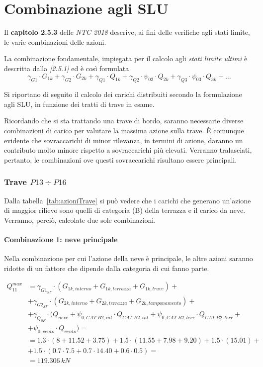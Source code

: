 \section{Combinazione agli SLU}
Il \textbf{capitolo 2.5.3} delle \emph{NTC 2018} descrive, ai fini delle verifiche agli stati limite, le varie combinazioni delle azioni. 

La combinazione fondamentale, impiegata per il calcolo agli \emph{stati limite ultimi} è descritta dalla \emph{[2.5.1]} ed è così formulata
\[
	\gamma_{G1}\cdot G_{1k} + \gamma_{G2}\cdot G_{2k} + \gamma_{Q1} \cdot Q_{1k} + \gamma_{Q2}\cdot \psi_{02}\cdot Q_{2k} + \gamma_{Q3}\cdot \psi_{03}\cdot Q_{3k} + \dots
\]

Si riportano di seguito il calcolo dei carichi distribuiti secondo la formulazione agli SLU, in funzione dei tratti di trave in esame.

Ricordando che si sta trattando una trave di bordo, saranno necessarie diverse combinazioni di carico per valutare la massima azione sulla trave. È comunque evidente che sovraccarichi di minor rilevanza, in termini di azione, daranno un contributo molto minore rispetto a sovraccarichi più elevati. Verranno tralasciati, pertanto, le combinazioni ove questi sovraccarichi risultano essere principali.

\subsubsection*{Trave $P13\div P16$}
Dalla tabella~\ref{tab:azioniTrave} si può vedere che i carichi che generano un'azione di maggior rilievo sono quelli di categoria (B) della terrazza e il carico da neve. Verranno, perciò, calcolate due sole combinazioni.

\paragraph{Combinazione 1: neve principale}
Nella combinazione per cui l'azione della neve è principale, le altre azioni saranno ridotte di un fattore che dipende dalla categoria di cui fanno parte.

\begin{align*}
	Q_{11}^{max} &=\gamma_{G1_{SF}}\cdot\left( G_{1k, interno} + G_{1k, terrazza} + G_{1k, trave} \right) +\\
	&+\gamma_{G2_{SF}}\cdot\left( G_{2k, interno} + G_{2k, terrazza} + G_{2k, tamponamento} \right) +\\
	&+\gamma_{Q_{SF}}\cdot (Q_{neve} + \psi_{0,CAT.B2,int}\cdot Q_{CAT.B2,int} + \psi_{0,CAT.B2,terr}\cdot Q_{CAT.B2,terr} +\\
	&+\psi_{0,vento}\cdot Q_{vento}) =\\
	&= 1.3\cdot(8+11.52 + 3.75)	+1.5\cdot(11.55+7.98 + 9.20) + 1.5\cdot(15.01) +\\
	&+1.5\cdot(0.7\cdot7.5+ 0.7\cdot 14.40 + 0.6\cdot 0.5) = \\
	&= 	119.306\,kN
\end{align*}






